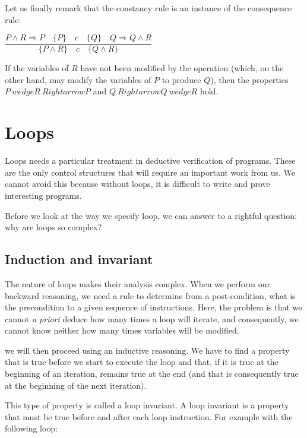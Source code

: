 \documentclass[12pt,francais,]{scrbook}
\begin{document}
Let us finally remark that the constancy rule is an instance of the
consequence rule:

\begin{center}\(\dfrac{P \wedge R \Rightarrow P \quad \{P\}\quad c\quad \{Q\} \quad Q \Rightarrow Q \wedge R}{\{P \wedge R\}\quad c\quad \{Q \wedge R\}}\)
\end{center}

If the variables of \(R\) have not been modified by the operation
(which, on the other hand, may modify the variables of \(P\) to produce
\(Q\)), then the properties \(P \ wedge R \ Rightarrow P\) and
\(Q \ Rightarrow Q \ wedge R\) hold.

\section{Loops}\label{loops}

Loops needs a particular treatment in deductive verification of
programs. These are the only control structures that will require an
important work from us. We cannot avoid this because without loops, it
is difficult to write and prove interesting programs.

Before we look at the way we specify loop, we can answer to a rightful
question: why are loops so complex?

\subsection{Induction and invariant}\label{induction-and-invariant}

The nature of loops makes their analysis complex. When we perform our
backward reasoning, we need a rule to determine from a post-condition,
what is the precondition to a given sequence of instructions. Here, the
problem is that we cannot \emph{a priori} deduce how many times a loop
will iterate, and consequently, we cannot know neither how many times
variables will be modified.

we will then proceed using an inductive reasoning. We have to find a
property that is true before we start to execute the loop and that, if
it is true at the beginning of an iteration, remains true at the end
(and that is consequently true at the beginning of the next iteration).

This type of property is called a loop invariant. A loop invariant is a
property that must be true before and after each loop instruction. For
example with the following loop:
\end{document}
